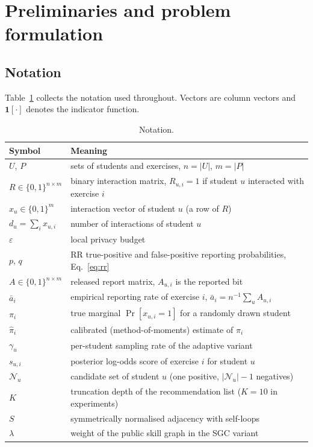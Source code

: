 \documentclass[pdflatex,sn-basic,Numbered]{sn-jnl}
\theoremstyle{plain}
\theoremstyle{remark}
\theoremstyle{definition}
\newcommand{\eps}{\varepsilon}
\newcommand{\Prob}{\Pr}
\begin{document}
\section{Preliminaries and problem formulation}\label{sec:prelim}

\subsection{Notation}

Table~\ref{tab:notation} collects the notation used throughout. Vectors are column vectors and $\mathbf{1}[\cdot]$ denotes the indicator function.

\begin{table}[t]
\caption{Notation.}
\label{tab:notation}
\small
\begin{tabular}{@{}ll@{}}
\toprule
Symbol & Meaning \\
\midrule
$U$, $P$ & sets of students and exercises, $n=|U|$, $m=|P|$ \\
$R\in\{0,1\}^{n\times m}$ & binary interaction matrix, $R_{u,i}=1$ if student $u$ interacted with exercise $i$ \\
$x_{u}\in\{0,1\}^{m}$ & interaction vector of student $u$ (a row of $R$) \\
$d_u=\sum_i x_{u,i}$ & number of interactions of student $u$ \\
$\eps$ & local privacy budget \\
$p$, $q$ & RR true-positive and false-positive reporting probabilities, Eq.~\eqref{eq:rr} \\
$A\in\{0,1\}^{n\times m}$ & released report matrix, $A_{u,i}$ is the reported bit \\
$\bar a_i$ & empirical reporting rate of exercise $i$, $\bar a_i=n^{-1}\sum_u A_{u,i}$ \\
$\pi_i$ & true marginal $\Prob[x_{u,i}=1]$ for a randomly drawn student \\
$\hat\pi_i$ & calibrated (method-of-moments) estimate of $\pi_i$ \\
$\gamma_u$ & per-student sampling rate of the adaptive variant \\
$s_{u,i}$ & posterior log-odds score of exercise $i$ for student $u$ \\
$\mathcal{N}_u$ & candidate set of student $u$ (one positive, $|\mathcal{N}_u|-1$ negatives) \\
$K$ & truncation depth of the recommendation list ($K=10$ in experiments) \\
$S$ & symmetrically normalised adjacency with self-loops \\
$\lambda$ & weight of the public skill graph in the SGC variant \\
\bottomrule
\end{tabular}
\end{table}
\end{document}
